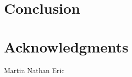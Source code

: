 \documentclass{sig-alternate}
\begin{document}

\section{Conclusion}


\section{Acknowledgments}
Martin
Nathan
Eric


%
%

\balancecolumns
\end{document}
